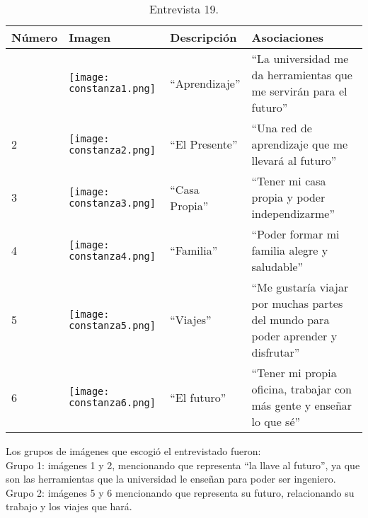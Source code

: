 \begin{table}[H]
	\centering
	\begin{tabular}{>{\centering\arraybackslash}m{1cm} >{\centering\arraybackslash}m{2cm} >{\arraybackslash}m{5cm}>{\arraybackslash}m{5cm}}
		\hline
		Número  & Imagen & Descripción & Asociaciones \\
		\hline \hline
		
		1 & \texttt{[image: constanza1.png]} & ``Aprendizaje'' & ``La universidad me da herramientas que me servirán para el futuro'' \\
		\hline
		
		2 & \texttt{[image: constanza2.png]} & ``El Presente'' & ``Una red de aprendizaje que me llevará al futuro'' \\
		\hline
		
		3 & \texttt{[image: constanza3.png]} & ``Casa Propia'' & ``Tener mi casa propia y poder independizarme'' \\
		\hline
		
		4 & \texttt{[image: constanza4.png]} & ``Familia'' & ``Poder formar mi familia alegre y saludable'' \\
		\hline
		
		5 & \texttt{[image: constanza5.png]} & ``Viajes'' & ``Me gustaría viajar por muchas partes del mundo para poder aprender y disfrutar'' \\
		\hline
		
		6 & \texttt{[image: constanza6.png]} & ``El futuro'' & ``Tener mi propia oficina, trabajar con más gente y enseñar lo que sé'' \\
		\hline
		
		
	\end{tabular}
	\caption{Entrevista 19.}
	\label{tabla:contanza}
\end{table}

Los grupos de imágenes que escogió el entrevistado fueron:\\

Grupo 1: imágenes 1 y 2, mencionando que representa ``la llave al futuro'', ya que son las herramientas que la universidad le enseñan para poder ser ingeniero. \\

Grupo 2: imágenes 5 y 6 mencionando que representa su futuro, relacionando su trabajo y los viajes que hará.\\

